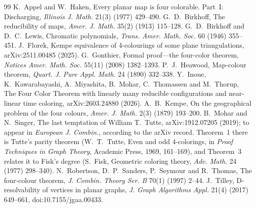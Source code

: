 \documentclass[11pt]{article}
\begin{document}
\begin{thebibliography}{99}
 K.~Appel and W.~Haken, Every planar map is four colorable. Part~I: Discharging, \emph{Illinois J. Math.} 21(3) (1977) 429--490. %
 G.~D.~Birkhoff, The reducibility of maps, \emph{Amer. J. Math.} 35(2) (1913) 115--128. %
 G.~D.~Birkhoff and D.~C.~Lewis, Chromatic polynomials, \emph{Trans. Amer. Math. Soc.} 60 (1946) 355--451.
 J.~Florek, Kempe equivalence of 4-colourings of some plane triangulations, arXiv:2511.00485 (2025). %
 G.~Gonthier, Formal proof---the four-color theorem, \emph{Notices Amer. Math. Soc.} 55(11) (2008) 1382--1393. %
 P.~J.~Heawood, Map-colour theorem, \emph{Quart. J. Pure Appl. Math.} 24 (1890) 332--338. %
 Y.~Inoue, K.~Kawarabayashi, A.~Miyashita, B.~Mohar, C.~Thomassen and M.~Thorup, The Four Color Theorem with linearly many reducible configurations and near-linear time coloring, arXiv:2603.24880 (2026). %
 A.~B.~Kempe, On the geographical problem of the four colours, \emph{Amer. J. Math.} 2(3) (1879) 193--200. %
 B.~Mohar and N.~Singer, The last temptation of William T.~Tutte, arXiv:1912.07205 (2019); to appear in \emph{European J. Combin.}, according to the arXiv record. Theorem~1 there is Tutte's parity theorem (W.~T.~Tutte, Even and odd 4-colorings, in \emph{Proof Techniques in Graph Theory}, Academic Press, 1969, 161--169), and Theorem~3 relates it to Fisk's degree (S.~Fisk, Geometric coloring theory, \emph{Adv. Math.} 24 (1977) 298--340). %
 N.~Robertson, D.~P.~Sanders, P.~Seymour and R.~Thomas, The four-colour theorem, \emph{J. Combin. Theory Ser. B} 70(1) (1997) 2--44. %
 J.~Tilley, D-resolvability of vertices in planar graphs, \emph{J. Graph Algorithms Appl.} 21(4) (2017) 649--661, doi:10.7155/jgaa.00433. %
\end{thebibliography}
\end{document}
